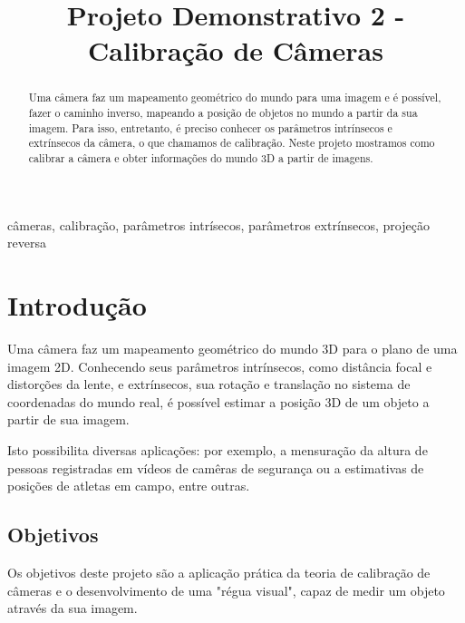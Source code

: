\documentclass[conference]{IEEEtran}
\begin{document}
\title{Projeto Demonstrativo 2 - Calibração de Câmeras}

\author{
}

\maketitle

\begin{abstract}
Uma câmera faz um mapeamento geométrico do mundo para uma imagem e é possível, fazer o caminho inverso, mapeando a posição de objetos no mundo a partir da sua imagem. Para isso, entretanto, é preciso conhecer os parâmetros intrínsecos e extrínsecos da câmera, o que chamamos de calibração. Neste projeto mostramos como calibrar a câmera e obter informações do mundo 3D a partir de imagens.
\end{abstract}

\begin{IEEEkeywords}
câmeras, calibração, parâmetros intrísecos, parâmetros extrínsecos, projeção reversa
\end{IEEEkeywords}

\section{Introdução}
Uma câmera faz um mapeamento geométrico do mundo 3D para o plano de uma imagem 2D. Conhecendo seus parâmetros intrínsecos, como distância focal e distorções da lente, e extrínsecos, sua rotação e translação no sistema de coordenadas do mundo real, é possível estimar a posição 3D de um objeto a partir de sua imagem\cite{tese}. 

Isto possibilita diversas aplicações: por exemplo, a mensuração da altura de pessoas registradas em vídeos de camêras de segurança ou a estimativas de posições de atletas em campo, entre outras.

\subsection{Objetivos}
Os objetivos deste projeto são a aplicação prática da teoria de calibração de câmeras e o desenvolvimento de uma "régua visual", capaz de medir um objeto através da sua imagem.
\end{document}
